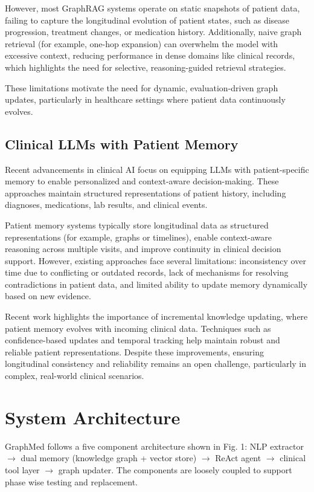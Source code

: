 \documentclass[conference]{IEEEtran}
\begin{document}
However, most GraphRAG systems operate on static snapshots of patient data, failing to capture the longitudinal evolution of patient states, such as disease progression, treatment changes, or medication history. Additionally, naive graph retrieval (for example, one-hop expansion) can overwhelm the model with excessive context, reducing performance in dense domains like clinical records, which highlights the need for selective, reasoning-guided retrieval strategies.

These limitations motivate the need for dynamic, evaluation-driven graph updates, particularly in healthcare settings where patient data continuously evolves.

\subsection{Clinical LLMs with Patient Memory}
Recent advancements in clinical AI focus on equipping LLMs with patient-specific memory to enable personalized and context-aware decision-making. These approaches maintain structured representations of patient history, including diagnoses, medications, lab results, and clinical events.

Patient memory systems typically store longitudinal data as structured representations (for example, graphs or timelines), enable context-aware reasoning across multiple visits, and improve continuity in clinical decision support. However, existing approaches face several limitations: inconsistency over time due to conflicting or outdated records, lack of mechanisms for resolving contradictions in patient data, and limited ability to update memory dynamically based on new evidence.

Recent work highlights the importance of incremental knowledge updating, where patient memory evolves with incoming clinical data. Techniques such as confidence-based updates and temporal tracking help maintain robust and reliable patient representations. Despite these improvements, ensuring longitudinal consistency and reliability remains an open challenge, particularly in complex, real-world clinical scenarios.

\section{System Architecture}
GraphMed follows a five component architecture shown in Fig. 1: NLP extractor $\rightarrow$ dual memory (knowledge graph + vector store) $\rightarrow$ ReAct agent $\rightarrow$ clinical tool layer $\rightarrow$ graph updater. The components are loosely coupled to support phase wise testing and replacement.
\end{document}
